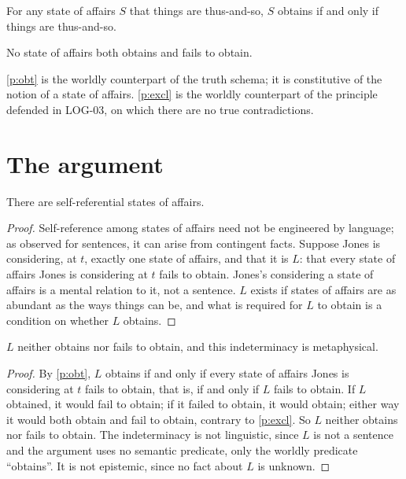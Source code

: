 \documentclass{situationist-preprint}
\begin{document}
\begin{principle}[Obtaining]\label{p:obt}
For any state of affairs $S$ that things are thus-and-so, $S$ obtains if and only if things are thus-and-so.
\end{principle}

\begin{principle}[Exclusion]\label{p:excl}
No state of affairs both obtains and fails to obtain.
\end{principle}

\ref{p:obt} is the worldly counterpart of the truth schema; it is constitutive of the notion of a state of affairs. \ref{p:excl} is the worldly counterpart of the principle defended in LOG-03, on which there are no true contradictions.

\section{The argument}

\begin{proposition}[Existence]\label{p:exist}
There are self-referential states of affairs.
\end{proposition}

\begin{proof}
Self-reference among states of affairs need not be engineered by language; as \citet{Kripke1975} observed for sentences, it can arise from contingent facts. Suppose Jones is considering, at $t$, exactly one state of affairs, and that it is $L$: that every state of affairs Jones is considering at $t$ fails to obtain. Jones's considering a state of affairs is a mental relation to it, not a sentence. $L$ exists if states of affairs are as abundant as the ways things can be, and what is required for $L$ to obtain is a condition on whether $L$ obtains.
\end{proof}

\begin{theorem}\label{t:main}
$L$ neither obtains nor fails to obtain, and this indeterminacy is metaphysical.
\end{theorem}

\begin{proof}
By \ref{p:obt}, $L$ obtains if and only if every state of affairs Jones is considering at $t$ fails to obtain, that is, if and only if $L$ fails to obtain. If $L$ obtained, it would fail to obtain; if it failed to obtain, it would obtain; either way it would both obtain and fail to obtain, contrary to \ref{p:excl}. So $L$ neither obtains nor fails to obtain. The indeterminacy is not linguistic, since $L$ is not a sentence and the argument uses no semantic predicate, only the worldly predicate \enquote{obtains}. It is not epistemic, since no fact about $L$ is unknown.
\end{proof}
\end{document}
